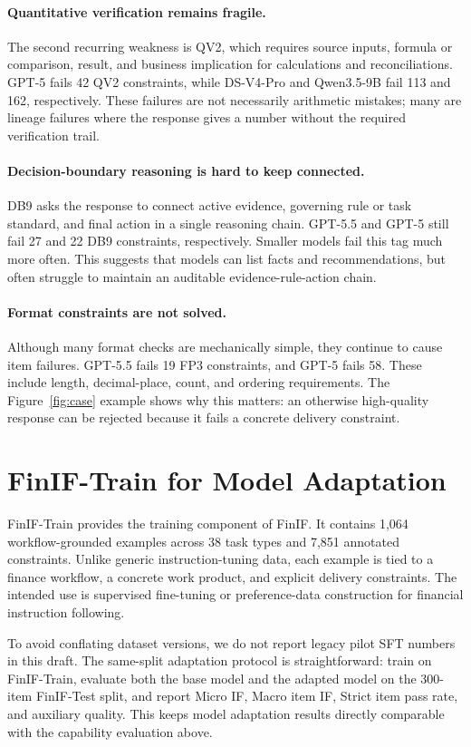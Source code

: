 \paragraph{Quantitative verification remains fragile.}
The second recurring weakness is QV2, which requires source inputs, formula or comparison, result, and business implication for calculations and reconciliations.
GPT-5 fails 42 QV2 constraints, while DS-V4-Pro and Qwen3.5-9B fail 113 and 162, respectively.
These failures are not necessarily arithmetic mistakes; many are lineage failures where the response gives a number without the required verification trail.

\paragraph{Decision-boundary reasoning is hard to keep connected.}
DB9 asks the response to connect active evidence, governing rule or task standard, and final action in a single reasoning chain.
GPT-5.5 and GPT-5 still fail 27 and 22 DB9 constraints, respectively.
Smaller models fail this tag much more often.
This suggests that models can list facts and recommendations, but often struggle to maintain an auditable evidence-rule-action chain.

\paragraph{Format constraints are not solved.}
Although many format checks are mechanically simple, they continue to cause item failures.
GPT-5.5 fails 19 FP3 constraints, and GPT-5 fails 58.
These include length, decimal-place, count, and ordering requirements.
The Figure~\ref{fig:case} example shows why this matters: an otherwise high-quality response can be rejected because it fails a concrete delivery constraint.

\section{FinIF-Train for Model Adaptation}
\label{sec:sft_experiment}

FinIF-Train provides the training component of FinIF.
It contains 1,064 workflow-grounded examples across 38 task types and 7,851 annotated constraints.
Unlike generic instruction-tuning data, each example is tied to a finance workflow, a concrete work product, and explicit delivery constraints.
The intended use is supervised fine-tuning or preference-data construction for financial instruction following.

To avoid conflating dataset versions, we do not report legacy pilot SFT numbers in this draft.
The same-split adaptation protocol is straightforward: train on FinIF-Train, evaluate both the base model and the adapted model on the 300-item FinIF-Test split, and report Micro IF, Macro item IF, Strict item pass rate, and auxiliary quality.
This keeps model adaptation results directly comparable with the capability evaluation above.
